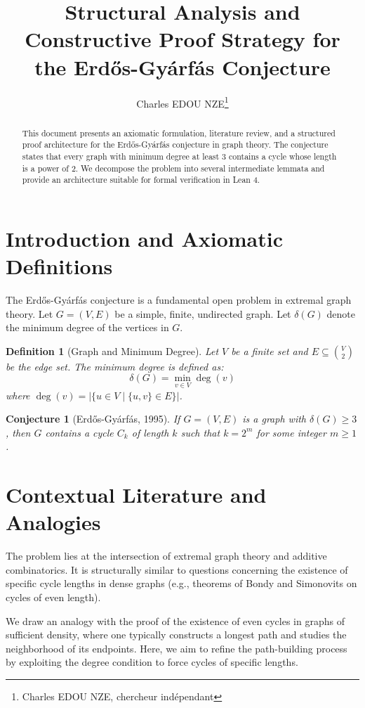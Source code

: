 \documentclass[11pt,a4paper]{article}
\title{Structural Analysis and Constructive Proof Strategy for the Erd\H{o}s-Gy\'{a}rf\'{a}s Conjecture}
\author{Charles EDOU NZE\thanks{Charles EDOU NZE, chercheur indépendant}}
\date{}
\newtheorem{definition}[theorem]{Definition}
\newtheorem{conjecture}[theorem]{Conjecture}
\begin{document}
\maketitle

\begin{abstract}
This document presents an axiomatic formulation, literature review, and a structured proof architecture for the Erd\H{o}s-Gy\'{a}rf\'{a}s conjecture in graph theory. The conjecture states that every graph with minimum degree at least 3 contains a cycle whose length is a power of 2. We decompose the problem into several intermediate lemmata and provide an architecture suitable for formal verification in Lean 4.
\end{abstract}

\section{Introduction and Axiomatic Definitions}
The Erd\H{o}s-Gy\'{a}rf\'{a}s conjecture is a fundamental open problem in extremal graph theory. Let $G = (V, E)$ be a simple, finite, undirected graph. Let $\delta(G)$ denote the minimum degree of the vertices in $G$.

\begin{definition}[Graph and Minimum Degree]
Let $V$ be a finite set and $E \subseteq \binom{V}{2}$ be the edge set. The minimum degree is defined as:
\[
\delta(G) = \min_{v \in V} \deg(v)
\]
where $\deg(v) = |\{u \in V \mid \{u, v\} \in E\}|$.
\end{definition}

\begin{conjecture}[Erd\H{o}s-Gy\'{a}rf\'{a}s, 1995]
If $G = (V, E)$ is a graph with $\delta(G) \ge 3$, then $G$ contains a cycle $C_k$ of length $k$ such that $k = 2^m$ for some integer $m \ge 1$.
\end{conjecture}

\section{Contextual Literature and Analogies}
The problem lies at the intersection of extremal graph theory and additive combinatorics. It is structurally similar to questions concerning the existence of specific cycle lengths in dense graphs (e.g., theorems of Bondy and Simonovits on cycles of even length).

We draw an analogy with the proof of the existence of even cycles in graphs of sufficient density, where one typically constructs a longest path and studies the neighborhood of its endpoints. Here, we aim to refine the path-building process by exploiting the degree condition to force cycles of specific lengths.
\end{document}

